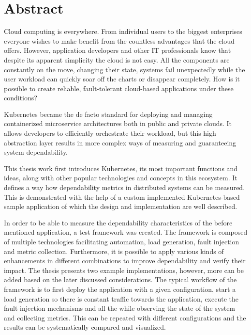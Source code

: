 \vfill
\selectenglish


\chapter*{Abstract}

Cloud computing is everywhere. From individual users to the biggest enterprises everyone wishes to make benefit from the countless advantages that the cloud offers. However, application developers and other IT professionals know that despite its apparent simplicity the cloud is not easy. All the components are constantly on the move, changing their state, systems fail unexpectedly while the user workload can quickly soar off the charts or disappear completely. How is it possible to create reliable, fault-tolerant cloud-based applications under these conditions?

Kubernetes became the de facto standard for deploying and managing containerized microservice architectures both in public and private clouds. It allows developers to efficiently orchestrate their workload, but this high abstraction layer results in more complex ways of measuring and guaranteeing system dependability.

This thesis work first introduces Kubernetes, its most important functions and ideas, along with other popular technologies and concepts in this ecosystem. It defines a way how dependability metrics in distributed systems can be measured. This is demonstrated with the help of a custom implemented Kubernetes-based sample application of which the design and implementation are well described.

In order to be able to measure the dependability characteristics of the before mentioned application, a test framework was created. The framework is composed of multiple technologies facilitating automation, load generation, fault injection and  metric collection. Furthermore, it is possible to apply various kinds of enhancements in different combinations to improve dependability and verify their impact. The thesis presents two example implementations, however, more can be added based on the later discussed considerations. The typical workflow of the framework is to first deploy the application with a given configuration, start a load generation so there is constant traffic towards the application, execute the fault injection mechanisms and all the while observing the state of the system and collecting metrics. This can be repeated with different configurations and the results can be systematically compared and visualized.


\vfill
\selectthesislanguage

\setcounter{romanPage}{\value{page}}
